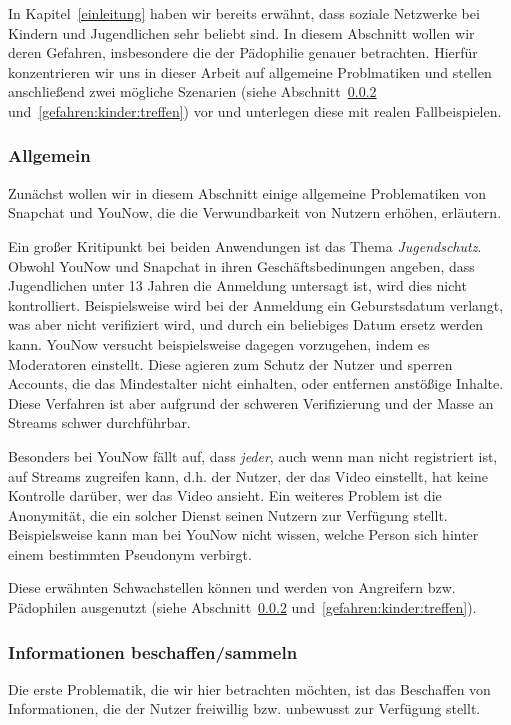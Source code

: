 In Kapitel~\ref{einleitung} haben wir bereits erw\"ahnt, dass soziale Netzwerke
bei Kindern und Jugendlichen sehr beliebt sind. In diesem Abschnitt wollen wir
deren Gefahren, insbesondere die der P\"adophilie genauer betrachten. Hierf\"ur
konzentrieren wir uns in dieser Arbeit auf allgemeine Problmatiken und stellen
anschlie{\ss}end zwei m\"ogliche Szenarien (siehe
Abschnitt~\ref{gefahren:kinder:informationen}
und~\ref{gefahren:kinder:treffen}) vor und unterlegen diese mit realen
Fallbeispielen.


\subsubsection{Allgemein}
\label{gefahren:kinder:allgemein}
Zun\"achst wollen wir in diesem Abschnitt einige allgemeine Problematiken von
Snapchat und YouNow, die die Verwundbarkeit von Nutzern erh\"ohen, erl\"autern.

Ein gro{\ss}er Kritipunkt bei beiden Anwendungen ist das Thema
\emph{Jugendschutz}. Obwohl YouNow und Snapchat in ihren Gesch\"aftsbedinungen
angeben, dass Jugendlichen unter 13 Jahren die Anmeldung untersagt ist, wird
dies nicht kontrolliert. Beispielsweise wird bei der Anmeldung ein
Geburstsdatum verlangt, was aber nicht verifiziert wird, und durch ein
beliebiges Datum ersetz werden kann. YouNow versucht beispielsweise dagegen
vorzugehen, indem es Moderatoren einstellt. Diese agieren zum Schutz der Nutzer
und sperren Accounts, die das Mindestalter nicht einhalten, oder entfernen
anst\"o{\ss}ige Inhalte. Diese Verfahren ist aber aufgrund der schweren
Verifizierung und der Masse an Streams schwer durchf\"uhrbar.

Besonders bei YouNow f\"allt auf, dass \emph{jeder}, auch wenn man nicht
registriert ist, auf Streams zugreifen kann, d.h. der Nutzer, der das Video
einstellt, hat keine Kontrolle dar\"uber, wer das Video ansieht. Ein weiteres
Problem ist die Anonymit\"at, die ein solcher Dienst seinen Nutzern zur
Verf\"ugung stellt. Beispielsweise kann man bei YouNow nicht wissen, welche
Person sich hinter einem bestimmten Pseudonym verbirgt.

Diese erw\"ahnten Schwachstellen k\"onnen und werden von Angreifern bzw.
P\"adophilen ausgenutzt (siehe Abschnitt~\ref{gefahren:kinder:informationen}
und~\ref{gefahren:kinder:treffen}).

\subsubsection{Informationen beschaffen/sammeln}
\label{gefahren:kinder:informationen}
Die erste Problematik, die wir hier betrachten m\"ochten, ist das Beschaffen von
Informationen, die der Nutzer freiwillig bzw. unbewusst zur Verf\"ugung stellt.


